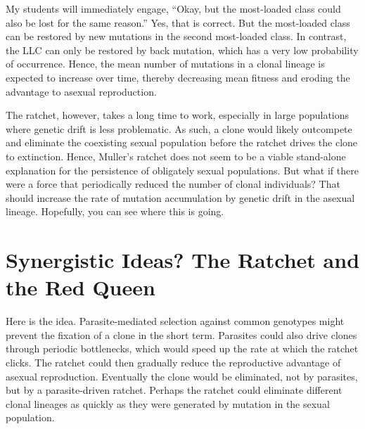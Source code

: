 \documentclass[
  american,
  letterpaper,
]{book}
\begin{document}
My students will immediately engage, ``Okay, but the most-loaded class
could also be lost for the same reason.'' Yes, that is correct. But the
most-loaded class can be restored by new mutations in the second
most-loaded class. In contrast, the LLC can only be restored by back
mutation, which has a very low probability of occurrence. Hence, the
mean number of mutations in a clonal lineage is expected to increase
over time, thereby decreasing mean fitness and eroding the advantage to
asexual reproduction.

The ratchet, however, takes a long time to work, especially in large
populations where genetic drift is less problematic. As such, a clone
would likely outcompete and eliminate the coexisting sexual population
before the ratchet drives the clone to extinction. Hence, Muller's
ratchet does not seem to be a viable stand-alone explanation for the
persistence of obligately sexual populations. But what if there were a
force that periodically reduced the number of clonal individuals? That
should increase the rate of mutation accumulation by genetic drift in
the asexual lineage. Hopefully, you can see where this is going.

\section{Synergistic Ideas? The Ratchet and the Red
Queen}\label{synergistic-ideas-the-ratchet-and-the-red-queen}

Here is the idea. Parasite-mediated selection against common genotypes
might prevent the fixation of a clone in the short term. Parasites could
also drive clones through periodic bottlenecks, which would speed up the
rate at which the ratchet clicks. The ratchet could then gradually
reduce the reproductive advantage of asexual reproduction. Eventually
the clone would be eliminated, not by parasites, but by a
parasite-driven ratchet. Perhaps the ratchet could eliminate different
clonal lineages as quickly as they were generated by mutation in the
sexual population.
\end{document}
